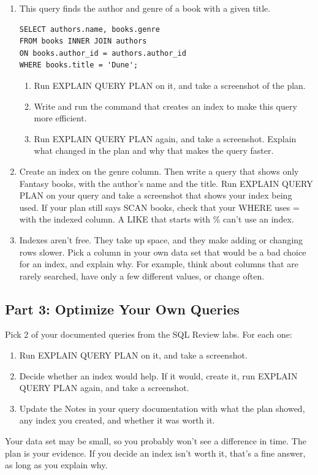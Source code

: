\documentclass[12pt]{article}
\begin{document}
\begin{enumerate}
    \item This query finds the author and genre of a book with a given title.
    \begin{Verbatim}
SELECT authors.name, books.genre
FROM books INNER JOIN authors
ON books.author_id = authors.author_id
WHERE books.title = 'Dune';
    \end{Verbatim}
    \begin{enumerate}
        \item Run EXPLAIN QUERY PLAN on it, and take a screenshot of the plan.
        \item Write and run the command that creates an index to make this query more efficient.
        \item Run EXPLAIN QUERY PLAN again, and take a screenshot. Explain what changed in the plan and why that makes the query faster.
    \end{enumerate}
    \item Create an index on the genre column. Then write a query that shows only Fantasy books, with the author's name and the title. Run EXPLAIN QUERY PLAN on your query and take a screenshot that shows your index being used. If your plan still says SCAN books, check that your WHERE uses = with the indexed column. A LIKE that starts with \% can't use an index.
    \item Indexes aren't free. They take up space, and they make adding or changing rows slower. Pick a column in your own data set that would be a bad choice for an index, and explain why. For example, think about columns that are rarely searched, have only a few different values, or change often.
\end{enumerate}

\subsection*{Part 3: Optimize Your Own Queries}
Pick 2 of your documented queries from the SQL Review labs. For each one:
\begin{enumerate}
    \item Run EXPLAIN QUERY PLAN on it, and take a screenshot.
    \item Decide whether an index would help. If it would, create it, run EXPLAIN QUERY PLAN again, and take a screenshot.
    \item Update the Notes in your query documentation with what the plan showed, any index you created, and whether it was worth it.
\end{enumerate}
Your data set may be small, so you probably won't see a difference in time. The plan is your evidence. If you decide an index isn't worth it, that's a fine answer, as long as you explain why.
\end{document}
